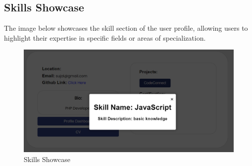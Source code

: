 
\subsection{Skills Showcase}
The image below showcases the skill section of the user profile, allowing users to highlight their expertise in specific fields or areas of specialization. 
\begin{figure}[H]
    \centering
    \includegraphics[width=1\textwidth]{Outcome-ss/skill-showcase.png}
    \caption{Skills Showcase}
    \label{fig:Skills Showcase}
\end{figure}
\newpage
